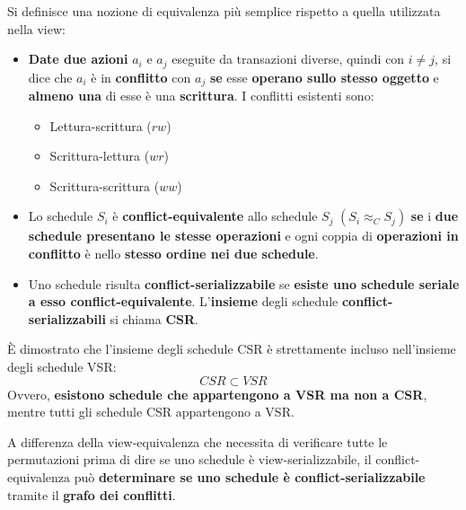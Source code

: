 \documentclass[a4paper]{article}
\begin{document}
	Si definisce una nozione di equivalenza più semplice rispetto a quella utilizzata nella view:
	\begin{itemize}
		\item \textbf{Date due azioni} $a_{i}$ e $a_{j}$ eseguite da transazioni diverse, quindi con $i \ne j$, si dice che $a_{i}$ è in \textcolor{Red3}{\textbf{conflitto}} con $a_{j}$ \textbf{se} esse \textbf{operano sullo stesso oggetto} e \textbf{almeno una} di esse è una \textbf{scrittura}.\newline
		I conflitti esistenti sono:
		\begin{itemize}
			\item Lettura-scrittura ($rw$)
			\item Scrittura-lettura ($wr$)
			\item Scrittura-scrittura ($ww$)
		\end{itemize}
		
		\item Lo schedule $S_{i}$ è \textcolor{Red3}{\textbf{conflict-equivalente}} allo schedule $S_{j}$ $\left(S_{i} \approx_{C} S_{j}\right)$ \textbf{se} i \textbf{due schedule presentano le stesse operazioni} e ogni coppia di \textbf{operazioni in conflitto} è nello \textbf{stesso ordine nei due schedule}.
		
		\item Uno schedule risulta \textcolor{Red3}{\textbf{conflict-serializzabile}} se \textbf{esiste uno schedule seriale a esso conflict-equivalente}. L'\textbf{insieme} degli schedule \textbf{conflict-serializzabili} si chiama \textcolor{Red3}{\textbf{CSR}}.
	\end{itemize}
	È dimostrato che l'insieme degli schedule CSR è strettamente incluso nell'insieme degli schedule VSR:
	\begin{equation*}
		CSR \subset VSR
	\end{equation*}
	Ovvero, \textbf{esistono schedule che appartengono a VSR ma non a CSR}, mentre tutti gli schedule CSR appartengono a VSR.\newline
	
	\noindent
	A differenza della view-equivalenza che necessita di verificare tutte le permutazioni prima di dire se uno schedule è view-serializzabile, il conflict-equivalenza può \textbf{determinare se uno schedule è conflict-serializzabile} tramite il \textcolor{Red3}{\textbf{grafo dei conflitti}}.
	
\end{document}
